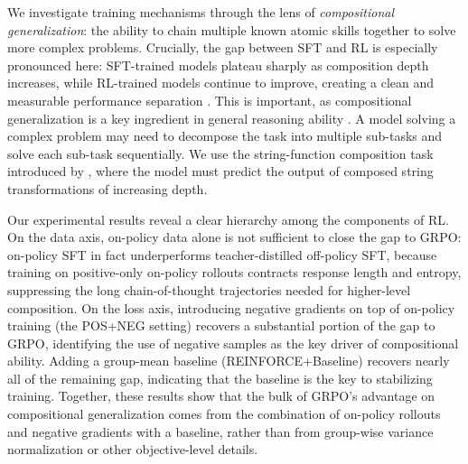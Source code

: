 \documentclass[12pt]{cmuthesis}
\begin{document}
We investigate training mechanisms through the lens of \emph{compositional generalization}: the ability to chain multiple known atomic skills together to solve more complex problems. Crucially, the gap between SFT and RL is especially pronounced here: SFT-trained models plateau sharply as composition depth increases, while RL-trained models continue to improve, creating a clean and measurable performance separation \citep{yuanLLMsLearnNewSkills2025, cheng_atomic_2025}.
This is important, as compositional generalization is a key ingredient in general reasoning ability \citep{yueDoesReinforcementLearning2025, park_how_2025}. A model solving a complex problem may need to decompose the task into multiple sub-tasks and solve each sub-task sequentially. 
We use the string-function composition task introduced by \citet{yuanLLMsLearnNewSkills2025}, where the model must predict the output of composed string transformations of increasing depth.

Our experimental results reveal a clear hierarchy among the components of RL. On the data axis, on-policy data alone is not sufficient to close the gap to GRPO: on-policy SFT in fact underperforms teacher-distilled off-policy SFT, because training on positive-only on-policy rollouts contracts response length and entropy, suppressing the long chain-of-thought trajectories needed for higher-level composition. On the loss axis, introducing negative gradients on top of on-policy training (the POS+NEG setting) recovers a substantial portion of the gap to GRPO, identifying the use of negative samples as the key driver of compositional ability. Adding a group-mean baseline (REINFORCE+Baseline) recovers nearly all of the remaining gap, indicating that the baseline is the key to stabilizing training. Together, these results show that the bulk of GRPO's advantage on compositional generalization comes from the combination of on-policy rollouts and negative gradients with a baseline, rather than from group-wise variance normalization or other objective-level details.
\end{document}

